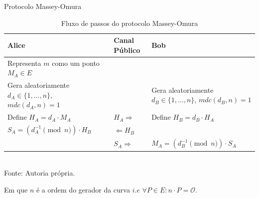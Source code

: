 \documentclass[brazil]{beamer}
\begin{document}
\begin{frame}{Protocolo Massey-Omura}
	
\begin{table}[h]\centering
	\vspace*{-0.4cm}
	\caption{Fluxo de passos do protocolo Massey-Omura}
	\vspace*{-0.4cm} \label{table:dbb74549-a025-428a-90f4-4efcedbdf9ca}
	\centering
		\begin{tabular}{|p{4cm}|p{3cm}|p{4cm}|}
		 
		\hline
		\textbf{Alice}                                                    & \textbf{Canal Público} & \textbf{Bob}                                                      \\
		\hline
		Representa $m$ como um ponto $M_A \in E$                          &                        &                                                                   \\
		\hline
		Gera aleatoriamente $d_A \in \{1, \ldots, n\}$, $mdc(d_A, n) = 1$ &                        & Gera aleatoriamente $d_B \in \{1, \ldots, n\}$, $mdc(d_B, n) = 1$ \\
		\hline
		Define $H_A = d_A \cdot M_A$                                      & $H_A \Rightarrow $     & Define $H_B = d_B \cdot H_A$                                      \\
		\hline
		$S_A =  (d^{-1}_A  \pmod{n}) \cdot H_B$                           & $\Leftarrow H_B$       &                                                                   \\
		\hline
		& $S_A \Rightarrow $     & $M_A =  (d^{-1}_B \pmod{n}) \cdot S_A $                           \\
		\hline
	\end{tabular}
	\vspace*{0.2cm}\\ %
	Fonte:  Autoria própria.
\end{table}
	\vspace*{-0.2cm}
 Em que $n$ é a ordem do gerador da curva $i.e$ $\forall P \in E:  n \cdot P =  \mathcal{O}$.
\end{frame}
\end{document}
